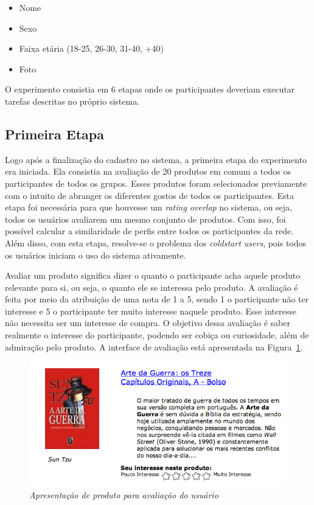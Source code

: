 \begin{itemize}
  \item Nome
  \item Sexo
  \item Faixa etária (18-25, 26-30, 31-40, +40)
  \item Foto
\end{itemize}

O experimento consistia em 6 etapas onde os participantes deveriam executar tarefas descritas no próprio sistema.

\subsection{Primeira Etapa}
\label{cha:primeira_etapa}

Logo após a finalização do cadastro no sistema, a primeira etapa do experimento era iniciada. Ela consistia na avaliação de 20 produtos em comum a todos os participantes de todos os grupos. Esses produtos foram selecionados previamente com o intuito de abranger os diferentes gostos de todos os participantes. Esta etapa foi necessária para que houvesse um \textit{rating overlap} no sistema, ou seja, todos os usuários avaliarem um mesmo conjunto de produtos. Com isso, foi possível calcular a similaridade de perfis entre todos os participantes da rede. Além disso, com esta etapa, resolve-se o problema dos \textit{coldstart users}, pois todos os usuários iniciam o uso do sistema ativamente.

Avaliar um produto significa dizer o quanto o participante acha aquele produto relevante para si, ou seja, o quanto ele se interessa pelo produto. A avaliação é feita por meio da atribuição de uma nota de 1 a 5, sendo 1 o participante não ter interesse e 5 o participante ter muito interesse naquele produto. Esse interesse não necessita ser um interesse de compra. O objetivo dessa avaliação é saber realmente o interesse do participante, podendo ser cobiça ou curiosidade, além de admiração pelo produto. A interface de avaliação está apresentada na Figura~\ref{fig:product-rating}.

\begin{figure}[htp]
  \centering
  \includegraphics[width=\textwidth]{imagens/product-rating}
  \caption{\it Apresentação de produto para avaliação do usuário}
  \label{fig:product-rating}
\end{figure}

